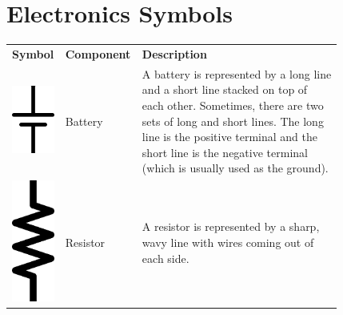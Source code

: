 \chapter{Electronics Symbols}
\label{appendixSymbols}

\begin{center}
\begin{tabular}{M{0.1\linewidth} | M{0.12\linewidth} | m{0.6\linewidth}}
\textbf{Symbol} & \textbf{Component} & \textbf{Description} \\
\includegraphics[scale=0.125]{BatterySymbol.png} & Battery & A battery is represented by a long line and a short line stacked on top of each other.  Sometimes, there are two sets of long and short lines.  The long line is the positive terminal and the short line is the negative terminal (which is usually used as the ground). \\ \hline
\includegraphics[scale=0.125]{ResistorSymbol.png} & Resistor & A resistor is represented by a sharp, wavy line with wires coming out of each side. \\ \hline

\end{tabular}
\end{center}
